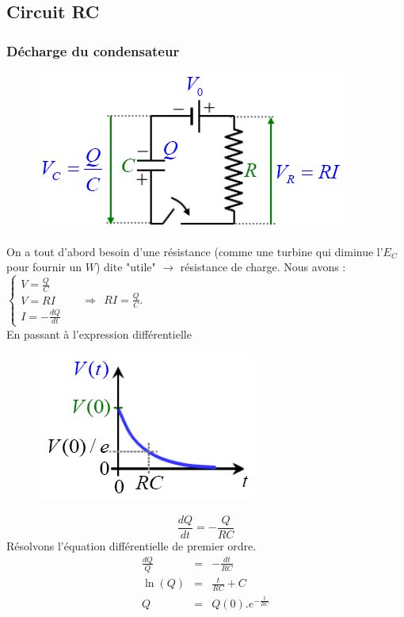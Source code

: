 \documentclass	[11pt, a4paper, openany]{book}
\begin{document}
\subsection{Circuit RC}
\subsubsection{Décharge du condensateur}
\begin{figure}
\includegraphics[scale=0.44]{es/image19.png}
\end{figure}
On a tout d'abord besoin d'une résistance (comme une turbine qui diminue l'$E_C$ pour fournir un $W$) dite "utile" $\rightarrow$ résistance de charge. Nous avons :\\
$\left\{\begin{array}{l}
V = \frac{Q}{C}\\
V = RI\\
I = -\frac{dQ}{dt}
\end{array}\right.$\ \ \ $\Rightarrow\ \ RI = \frac{Q}{C}$.\\
En passant à l'expression différentielle
\begin{figure}
\includegraphics[scale=0.44]{es/image20.png}
\end{figure}
\begin{equation}
\frac{dQ}{dt} = - \frac{Q}{RC}
\end{equation}
Résolvons l'équation différentielle de premier ordre.
\begin{eqnarray}
\frac{dQ}{Q} &=& -\frac{dt}{RC}\\
\ln (Q) &=& \frac{t}{RC} + C\\
Q &=& Q(0).e^{-\frac{t}{RC}}
\end{eqnarray}
\end{document}
